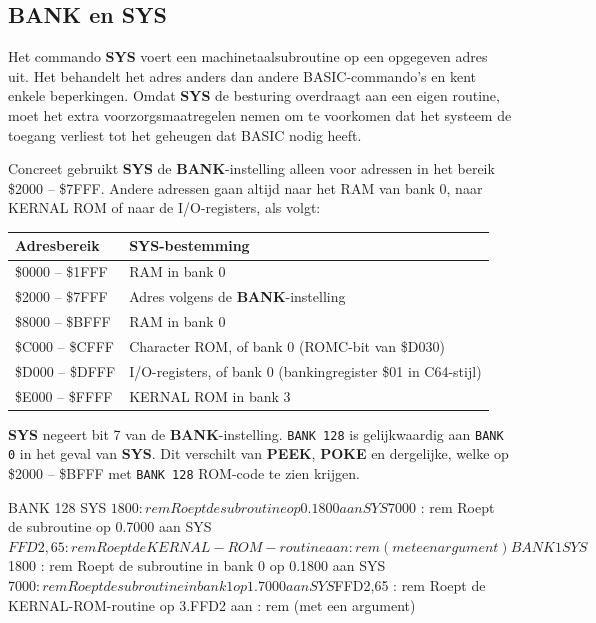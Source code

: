 \subsection{BANK en SYS}

Het commando {\bf SYS} voert een machinetaalsubroutine op een opgegeven adres uit. Het behandelt het adres anders dan andere BASIC-commando's en kent enkele beperkingen. Omdat {\bf SYS} de besturing overdraagt aan een eigen routine, moet het extra voorzorgsmaatregelen nemen om te voorkomen dat het systeem de toegang verliest tot het geheugen dat BASIC nodig heeft.

Concreet gebruikt {\bf SYS} de {\bf BANK}-instelling alleen voor adressen in het bereik \$2000 -- \$7FFF. Andere adressen gaan altijd naar het RAM van bank 0, naar KERNAL ROM of naar de I/O-registers, als volgt:

\begin{tabular}{|l|l|}
\hline
{\bf Adresbereik} & {\bf SYS-bestemming} \\
\hline
\$0000 -- \$1FFF & RAM in bank 0 \\
\hline
\$2000 -- \$7FFF & Adres volgens de {\bf BANK}-instelling \\
\hline
\$8000 -- \$BFFF & RAM in bank 0 \\
\hline
\$C000 -- \$CFFF & Character ROM, of bank 0 (ROMC-bit van \$D030) \\
\hline
\$D000 -- \$DFFF & I/O-registers, of bank 0 (bankingregister \$01 in C64-stijl) \\
\hline
\$E000 -- \$FFFF & KERNAL ROM in bank 3 \\
\hline
\end{tabular}

{\bf SYS} negeert bit 7 van de {\bf BANK}-instelling. \texttt{BANK 128} is gelijkwaardig aan \texttt{BANK 0} in het geval van {\bf SYS}. Dit verschilt van {\bf PEEK}, {\bf POKE} en dergelijke, welke op \$2000 -- \$BFFF met \texttt{BANK 128} ROM-code te zien krijgen.

\begin{basiccodesmall}
BANK 128
SYS $1800     : rem Roept de subroutine op 0.1800 aan
SYS $7000     : rem Roept de subroutine op 0.7000 aan
SYS $FFD2,65  : rem Roept de KERNAL-ROM-routine aan
              : rem (met een argument)

BANK 1
SYS $1800     : rem Roept de subroutine in bank 0 op 0.1800 aan
SYS $7000     : rem Roept de subroutine in bank 1 op 1.7000 aan
SYS $FFD2,65  : rem Roept de KERNAL-ROM-routine op 3.FFD2 aan
              : rem (met een argument)
\end{basiccodesmall}

